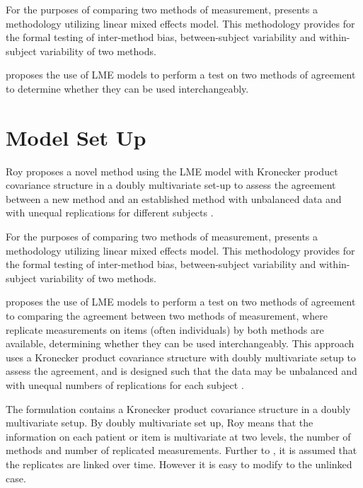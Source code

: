 \documentclass[12pt, a4paper]{report}
\theoremstyle{plain}
\theoremstyle{definition}
\theoremstyle{remark}
\begin{document}
For the purposes of comparing two methods of measurement, \citet{ARoy2009} presents a methodology utilizing linear mixed effects model. This methodology provides for the formal testing of inter-method bias, between-subject variability and within-subject variability of two methods.

\citet{ARoy2009} proposes the use of LME models to perform a test on two methods of agreement to determine whether they can be used 	interchangeably.
\section{Model Set Up}


Roy proposes a novel method using the LME model with Kronecker product covariance structure in a doubly multivariate set-up to assess the agreement between a new method and an established method with unbalanced data and with unequal replications for different subjects \citep{Roy}.


\bigskip 

For the purposes of comparing two methods of measurement, \citet{ARoy2009} presents a methodology utilizing linear mixed effects model. This methodology provides for the formal testing of inter-method bias, between-subject variability and within-subject variability of two methods. 




\bigskip

\citet{ARoy2009} proposes the use of LME models to perform a test on two methods of agreement to comparing the agreement between two methods of measurement, where replicate measurements on items (often individuals) by both methods are available, determining whether they can be used
interchangeably. This approach uses a Kronecker product covariance structure with doubly multivariate setup to
assess the agreement, and is designed such that the data may be unbalanced and with unequal numbers of replications for each subject \citep{ARoy2009}.

\bigskip

The formulation contains a Kronecker product covariance structure in a doubly multivariate setup. By doubly multivariate set up, Roy means that the information on each patient or item is multivariate at two levels, the number of methods and number of replicated measurements. Further to \citet{lam}, it is assumed that the replicates are linked over time. However it is easy to modify to the unlinked case.

\end{document}
